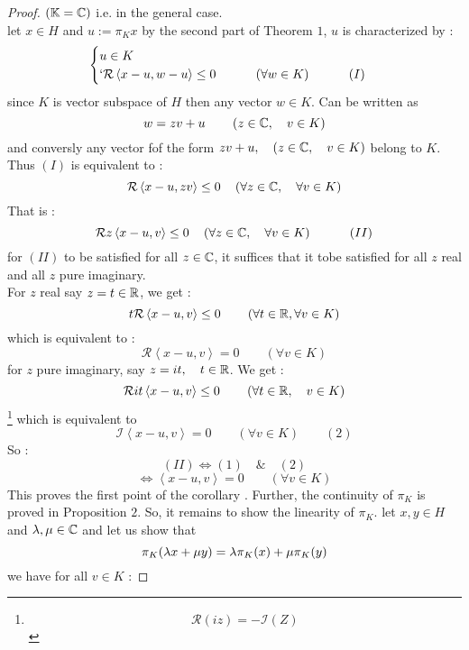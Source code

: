\begin{proof}
$(\mathbb{K} = \mathbb{C} )$ i.e. in the general case. \\ 
let $x \in  H$ and $u := \pi _{K}{x} $ 
by the second part of Theorem $1$, $u $ 
is characterized by : 
\[
  \begin{cases}
    u \in  K \\`
    \mathcal{R} \left\langle 
      x-u, w-u
    \right\rangle  \leq 0 \quad  \quad \quad 
    \left( \forall w \in  K\right) 
    \quad  \quad \quad (I) 
  \end{cases}
\]
since $K $ is vector subspace of $H $ then 
any vector $w \in  K $. Can be written 
as 
\[
w = z v + u \quad \quad \left( 
  z \in  \mathbb{C} , \quad v \in K
\right)
\]
and conversly any vector fof the form 
$zv + u, \quad (z \in  \mathbb{C}, \quad v \in K) $ belong 
to $K $. Thus $(I)$ is equivalent to : 
\[
\mathcal{R} \left\langle 
  x-u, zv
\right\rangle  \leq 0 \quad \left( 
  \forall  z \in \mathbb{C} , \quad  \forall v \in  K
\right)
\]
That is : 
\[
\mathcal{R} 
z
\left\langle 
  x-u, 
  v
\right\rangle  \leq 0 \quad \left( 
  \forall z \in  \mathbb{C} , \quad 
  \forall v \in  K
\right) \quad \quad \quad 
(II) 
\]
for $(II)$ to be satisfied for all 
$z \in  \mathbb{C}$, 
it suffices that it tobe satisfied
for all $z$ real and 
all $z $ pure imaginary. \\
For $z $ real say $z = t \in \mathbb{R}  $, we get : 
\[
t \mathcal{R} \left\langle 
  x-u, v
\right\rangle  \leq 0 \quad \quad 
\left( 
  \forall  t \in  \mathbb{R} ,
  \forall  v \in  K
\right)
\]
which is equivalent to : 
\[
\mathcal{R} \left\langle 
  x-u, v
\right\rangle  = 0 \quad \quad 
\left( 
  \forall  v \in  K
\right)
\]
for $z $ pure imaginary, say $z = 
it, \quad t \in \mathbb{R} $. We get : 
\[
  \mathcal{R} 
  it \left\langle 
    x-u, v
  \right\rangle  \leq 0 \quad 
  \quad 
  \left( 
    \forall t \in \mathbb{R} , \quad 
    v \in  K
  \right)
\]
\footnote{
  \[
  \mathcal{R}(iz)   = - \mathcal{I}  (Z) 
  \]
}
which is equivalent to 
\[
\mathcal{I} 
\left\langle 
  x-u, v
\right\rangle  = 0 \quad 
\quad \left( 
  \forall v \in  K
\right) \quad \quad (2) 
\]
So : 
\[
  (II)  \iff (1)  \quad \&  \quad (2) 
\]
\[
\iff \left\langle x-u, v \right\rangle  
= 0 \quad \quad 
\left( 
  \forall v \in  K
\right)
\]
This proves the first point of
the corollary . 
Further, the continuity of $\pi _{K} $ 
is proved in Proposition $2 $. So, it remains
to show the linearity of $\pi _{K} $. 
let $x,y \in  H $ and $\lambda,\mu \in  \mathbb{C}  $ and 
let us show that 
\[
\pi _{K}(\lambda x + \mu  y)  
= 
\lambda \pi _{K}(x)  + 
\mu \pi _{K}(y) 
\]
we have for all $v \in K $ :

\end{proof}
